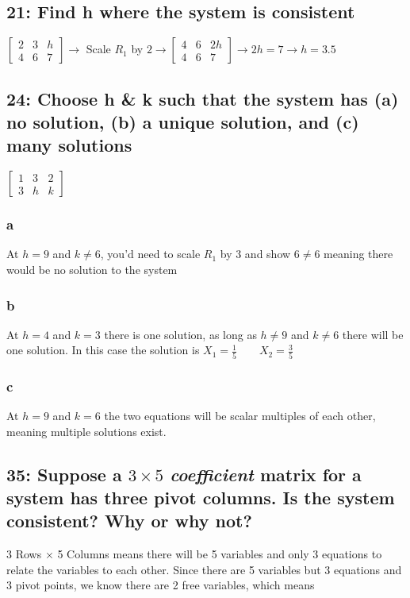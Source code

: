 \documentclass{article}
\begin{document}
\subsection*{21: Find h where the system is consistent}
$\left[\begin{array}{cc|c}
    2 & 3 & h \\
    4 & 6 & 7 
\end{array}\right] \rightarrow$ Scale $R_1$ by $2 \rightarrow
\left[\begin{array}{cc|c}
    4 & 6 & 2h \\
    4 & 6 & 7 
\end{array}\right] \rightarrow 2h=7 \rightarrow \boxed{h=3.5}
$
\subsection*{24: Choose h \& k such that the system has (a) no solution, (b) a unique solution, and (c) many solutions}
$\left[\begin{array}{cc|c}
    1 & 3 & 2 \\
    3 & h & k 
\end{array}\right]$
\subsubsection*{a}
At $h=9$ and $k\neq 6$, you'd need to scale $R_1$ by 3 and show $6\neq 6$ meaning there would be no solution to the system
\subsubsection*{b}
At $h=4$ and $k=3$ there is one solution, as long as $h \neq 9$ and $k \neq 6$ there will be one solution. In this case the solution is $X_1=\frac{1}{5} \qquad X_2 = \frac{3}{5}$
\subsubsection*{c}
At $h=9$ and $k=6$ the two equations will be scalar multiples of each other, meaning multiple solutions exist.
\subsection*{35: Suppose a $3\times 5$ \textit{coeﬃcient} matrix for a system has three pivot columns. Is the system consistent? Why or why not?}
3 Rows $\times$ 5 Columns means there will be 5 variables and only 3 equations to relate the variables to each other. Since there are 5 variables but 3 equations and 3 pivot points, we know there are 2 free variables, which means 
\end{document}
